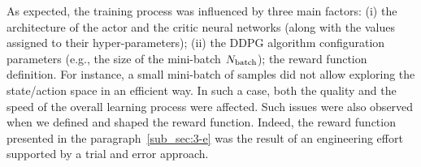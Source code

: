 As expected, the training process  was influenced by three main factors: (i) the architecture of the actor and the critic neural networks (along with the values assigned to their hyper-parameters); (ii) the DDPG algorithm configuration parameters (e.g., the size of the  mini-batch $N_{\rm batch}$); the reward function definition.
For instance, a small mini-batch of samples  did not allow exploring the state/action space in an efficient way. In such a case, both the quality and the speed of the overall learning process were affected. Such issues were also observed when we defined and shaped the reward function. Indeed, the reward function presented in the paragraph~\ref{sub_sec:3-e} was the result of an engineering effort supported by a trial and error approach.

